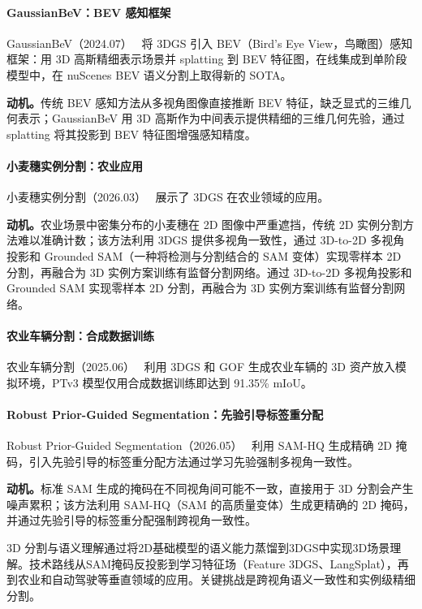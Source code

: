 \paragraph{GaussianBeV：BEV 感知框架} GaussianBeV（2024.07）~\cite{2407_14108} 将 3DGS 引入 BEV（Bird's Eye View，鸟瞰图）感知框架：用 3D 高斯精细表示场景并 splatting 到 BEV 特征图，在线集成到单阶段模型中，在 nuScenes BEV 语义分割上取得新的 SOTA。

\textbf{动机。}传统 BEV 感知方法从多视角图像直接推断 BEV 特征，缺乏显式的三维几何表示；GaussianBeV 用 3D 高斯作为中间表示提供精细的三维几何先验，通过 splatting 将其投影到 BEV 特征图增强感知精度。

\paragraph{小麦穗实例分割：农业应用} 小麦穗实例分割（2026.03）~\cite{2603_14309} 展示了 3DGS 在农业领域的应用。

\textbf{动机。}农业场景中密集分布的小麦穗在 2D 图像中严重遮挡，传统 2D 实例分割方法难以准确计数；该方法利用 3DGS 提供多视角一致性，通过 3D-to-2D 多视角投影和 Grounded SAM（一种将检测与分割结合的 SAM 变体）实现零样本 2D 分割，再融合为 3D 实例方案训练有监督分割网络。通过 3D-to-2D 多视角投影和 Grounded SAM 实现零样本 2D 分割，再融合为 3D 实例方案训练有监督分割网络。

\paragraph{农业车辆分割：合成数据训练} 农业车辆分割（2025.06）~\cite{2506_05009} 利用 3DGS 和 GOF 生成农业车辆的 3D 资产放入模拟环境，PTv3 模型仅用合成数据训练即达到 91.35\% mIoU。

\paragraph{Robust Prior-Guided Segmentation：先验引导标签重分配} Robust Prior-Guided Segmentation（2026.05）~\cite{2605_16065} 利用 SAM-HQ 生成精确 2D 掩码，引入先验引导的标签重分配方法通过学习先验强制多视角一致性。

\textbf{动机。}标准 SAM 生成的掩码在不同视角间可能不一致，直接用于 3D 分割会产生噪声累积；该方法利用 SAM-HQ（SAM 的高质量变体）生成更精确的 2D 掩码，并通过先验引导的标签重分配强制跨视角一致性。

\begin{takeaway}
3D 分割与语义理解通过将2D基础模型的语义能力蒸馏到3DGS中实现3D场景理解。技术路线从SAM掩码反投影到学习特征场（Feature 3DGS、LangSplat），再到农业和自动驾驶等垂直领域的应用。关键挑战是跨视角语义一致性和实例级精细分割。
\end{takeaway}


